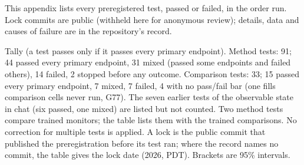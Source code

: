 \providecommand{\frPass}{\textcolor{gbaqua}{pass}}
\providecommand{\frFail}{\textcolor{gborange}{fail}}
\providecommand{\frMixed}{\textcolor{gbmute}{mixed}}
\providecommand{\frGroup}[1]{\multicolumn{4}{@{}l@{}}{\cellcolor{gbgroup}\textbf{#1}}\\*}

This appendix lists every preregistered test, passed or failed, in the order run. Lock commits are public (withheld here for anonymous review); details, data and causes of failure are in the repository's record.

Tally (a test passes only if it passes every primary endpoint). Method tests: 91; 44 passed every primary endpoint, 31 mixed (passed some endpoints and failed others), 14 failed, 2 stopped before any outcome. Comparison tests: 33; 15 passed every primary endpoint, 7 mixed, 7 failed, 4 with no pass/fail bar (one fills comparison cells never run, G77). The seven earlier tests of the observable state in chat (six passed, one mixed) are listed but not counted. Two method tests compare trained monitors; the table lists them with the trained comparisons. No correction for multiple tests is applied. A lock is the public commit that published the preregistration before its test ran; where the record names no commit, the table gives the lock date (2026, PDT). Brackets are 95\% intervals.

